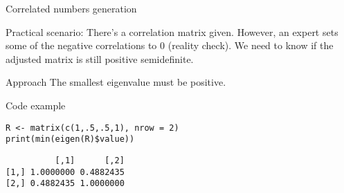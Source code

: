 \documentclass[presentation]{beamer}
\begin{document}
\begin{frame}[fragile,label=sec-2-3]{Correlated numbers generation}
 \begin{block}{Practical scenario:}
There's a correlation matrix given. However, an expert sets some of the negative correlations to 0 (reality check).
We need to know if the adjusted matrix is still positive semidefinite.
\end{block}
\begin{block}{Approach}
The smallest eigenvalue must be positive.
\end{block}
\begin{block}{Code example}
\begin{verbatim}
R <- matrix(c(1,.5,.5,1), nrow = 2)
print(min(eigen(R)$value))
\end{verbatim}

\begin{verbatim}
          [,1]      [,2]
[1,] 1.0000000 0.4882435
[2,] 0.4882435 1.0000000
\end{verbatim}
\end{block}
\end{frame}
\end{document}
